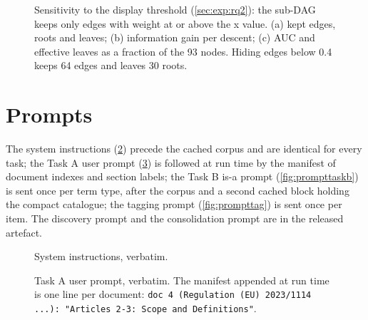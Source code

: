 \begin{table}[t]
  \centering
  \caption{Recorded API usage and cost of every stage at list price (USD);
  cached tokens are read at a tenth of the input rate. Task~A and~B prompts
  exceed 100K tokens and are priced on the long-prompt card.}
  \label{tab:billing}
  \scriptsize
  \begin{minipage}{0.8\textwidth}\end{minipage}
\end{table}

\begin{figure}[t]
  \centering
  
  \caption{Sensitivity to the display threshold (\cref{sec:exp:rq2}): the
  sub-DAG keeps only edges with weight at or above the x value. (a) kept edges,
  roots and leaves; (b) information gain per descent; (c) AUC and effective
  leaves as a fraction of the 93 nodes. Hiding edges below 0.4 keeps 64 edges
  and leaves 30 roots.}
  \label{fig:spectrum}
\end{figure}

\section{Prompts}
\label{app:prompts}
The system instructions (\cref{fig:promptsys}) precede the cached corpus and are
identical for every task; the Task A user prompt (\cref{fig:prompttask}) is
followed at run time by the manifest of document indexes and section labels;
the Task B is-a prompt (\cref{fig:prompttaskb}) is sent once per term type,
after the corpus and a second cached block holding the compact catalogue; the
tagging prompt (\cref{fig:prompttag}) is sent once per item. The discovery
prompt and the consolidation prompt are in the released artefact.

\begin{figure}[tbp]

\caption{System instructions, verbatim.}
\label{fig:promptsys}
\end{figure}

\begin{figure}[tbp]

\caption{Task A user prompt, verbatim. The manifest appended at run time is
one line per document: \texttt{doc 4 (Regulation (EU) 2023/1114 ...): "Articles
2-3: Scope and Definitions"}.}
\label{fig:prompttask}
\end{figure}

